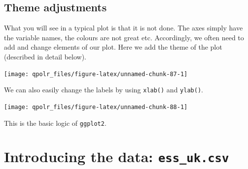 \documentclass[12pt,oneside]{reedthesis}
\theoremstyle{definition}
\theoremstyle{definition}
\theoremstyle{definition}
\theoremstyle{remark}
\begin{document}
  \subsection{Theme adjustments}\label{theme-adjustments}
  
  What you will see in a typical plot is that it is not done. The axes
  simply have the variable names, the colours are not great etc.
  Accordingly, we often need to add and change elements of our plot. Here
  we add the theme of the plot (described in detail below).
  \begin{Shaded}
  \begin{Highlighting}[]
  \NormalTok{(}\OperatorTok{+}
  \StringTok{  }\NormalTok{() }\OperatorTok{+}
  \StringTok{  }\NormalTok{()}
  \end{Highlighting}
  \end{Shaded}
  \begin{center}\texttt{[image: qpolr\_files/figure-latex/unnamed-chunk-87-1]} \end{center}
  
  We can also easily change the labels by using \texttt{xlab()} and
  \texttt{ylab()}.
  \begin{Shaded}
  \end{Shaded}
  \begin{center}\texttt{[image: qpolr\_files/figure-latex/unnamed-chunk-88-1]} \end{center}
  
  This is the basic logic of \texttt{ggplot2}.
  
  \section{\texorpdfstring{Introducing the data:
  \texttt{ess\_uk.csv}}{Introducing the data: ess\_uk.csv}}\label{introducing-the-data-ess_uk.csv}
  
\end{document}
